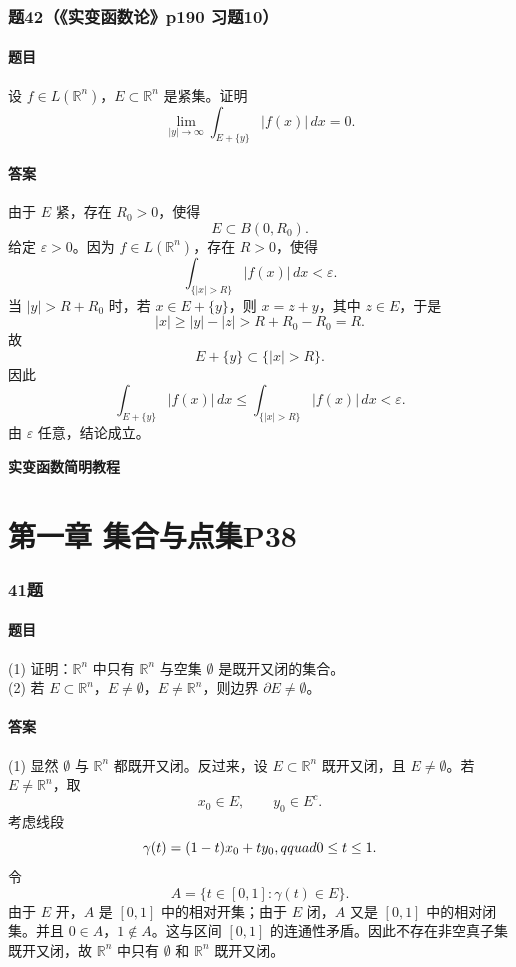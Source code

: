 \documentclass{article}
\newcommand{\R}{\mathbb{R}}
\newcommand{\eps}{\varepsilon}
\begin{document}
\subsubsection*{题42（《实变函数论》p190 习题10）}
\paragraph{题目}设 $f\in L(\R^n)$，$E\subset\R^n$ 是紧集。证明
\[
\lim_{|y|\to\infty}\int_{E+\{y\}}|f(x)|\,dx=0.
\]

\paragraph{答案}由于 $E$ 紧，存在 $R_0>0$，使得
\[
E\subset B(0,R_0).
\]
给定 $\eps>0$。因为 $f\in L(\R^n)$，存在 $R>0$，使得
\[
\int_{\{|x|>R\}}|f(x)|\,dx<\eps.
\]
当 $|y|>R+R_0$ 时，若 $x\in E+\{y\}$，则 $x=z+y$，其中 $z\in E$，于是
\[
|x|\ge |y|-|z|>R+R_0-R_0=R.
\]
故
\[
E+\{y\}\subset\{|x|>R\}.
\]
因此
\[
\int_{E+\{y\}}|f(x)|\,dx
\le
\int_{\{|x|>R\}}|f(x)|\,dx
<\eps.
\]
由 $\eps$ 任意，结论成立。

\newpage

\begin{center}
	{\Large \textbf{实变函数简明教程}}\\[0.3cm]
\end{center}

\section*{第一章 \quad 集合与点集\quad P38}

\subsubsection*{41题}
\paragraph{题目} (1) 证明：$\mathbb{R}^n$ 中只有 $\mathbb{R}^n$ 与空集 $\emptyset$ 是既开又闭的集合。\\
(2) 若 $E\subset\mathbb{R}^n$，$E\neq\emptyset$，$E\neq\mathbb{R}^n$，则边界 $\partial E\neq\emptyset$。

\paragraph{答案} (1) 显然 $\emptyset$ 与 $\mathbb{R}^n$ 都既开又闭。反过来，设 $E\subset\mathbb{R}^n$ 既开又闭，且 $E\neq\emptyset$。若 $E\neq\mathbb{R}^n$，取
\[
 x_0\in E,\qquad y_0\in E^c.
\]
考虑线段
\[
 \gamma(t)=(1-t)x_0+ty_0,\\qquad 0\le t\le 1.
\]
令
\[
 A=\{t\in[0,1]:\gamma(t)\in E\}.
\]
由于 $E$ 开，$A$ 是 $[0,1]$ 中的相对开集；由于 $E$ 闭，$A$ 又是 $[0,1]$ 中的相对闭集。并且 $0\in A$，$1\notin A$。这与区间 $[0,1]$ 的连通性矛盾。因此不存在非空真子集既开又闭，故 $\mathbb{R}^n$ 中只有 $\emptyset$ 和 $\mathbb{R}^n$ 既开又闭。
\end{document}

